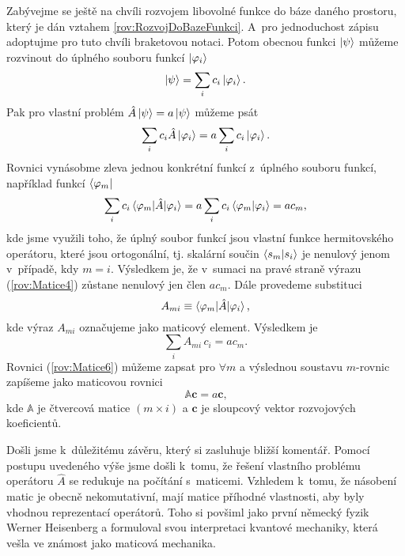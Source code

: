 Zabývejme se ještě na chvíli rozvojem libovolné funkce do báze daného prostoru, který je dán vztahem \eqref{rov:RozvojDoBazeFunkci}. A~pro jednoduchost zápisu adoptujme pro tuto chvíli braketovou notaci. Potom obecnou funkci $\ket{\psi}$ můžeme rozvinout do úplného souboru funkcí $\ket{\varphi_i}$
\begin{equation}
\ket{\psi} = \sum_i c_i \ket{\varphi_i} \mbox{.}
\nonumber
\end{equation}
Pak pro vlastní problém $\hat{A} \ket{\psi} = a \ket{\psi}$ můžeme psát
\begin{equation}
\sum_i c_i \hat{A} \ket{\varphi_i} = a \sum_i c_i \ket{\varphi_i} \mbox{.}
\nonumber
\end{equation}
Rovnici vynásobme zleva jednou konkrétní funkcí z~úplného souboru funkcí, například funkcí $\bra{\varphi_m}$
\begin{equation}
\sum_i c_i \braket{\varphi_m|\hat{A}|\varphi_i} = a \sum_i c_i \braket{\varphi_m|\varphi_i}= a c_m \mbox{,}
\label{rov:Matice4}
\end{equation}
kde jsme využili toho, že úplný soubor funkcí jsou vlastní funkce hermitovského operátoru, které jsou ortogonální, tj. skalární součin $\braket{s_m|s_i}$ je nenulový jenom v~případě, kdy $m=i$. Výsledkem je, že v~sumaci na pravé straně výrazu (\ref{rov:Matice4}) zůstane nenulový jen člen $a c_m$. Dále provedeme substituci
\begin{equation}
A_{mi} \equiv \braket{\varphi_m|\hat{A}|\varphi_i} \mbox{,}
\nonumber
\end{equation}
kde výraz $A_{mi}$ označujeme jako maticový element. Výsledkem je 
\begin{equation}
\sum_i A_{mi} \, c_i = a c_m \mbox{.}
\label{rov:Matice6}
\end{equation}
Rovnici (\ref{rov:Matice6}) můžeme zapsat pro $\forall m$ a výslednou soustavu $m$-rovnic zapíšeme jako maticovou rovnici
\begin{equation}
\boxed{\mathbb{A} \mathbf{c} = a \mathbf{c} \mbox{,}}
\label{rov:Matice7-vysledek}
\end{equation}
kde $\mathbb{A}$ je čtvercová matice $(m \times i)$ a $\mathbf{c}$ je sloupcový vektor rozvojových koeficientů.

Došli jsme k~důležitému závěru, který si zasluhuje bližší komentář. Pomocí postupu uvedeného výše jsme došli k~tomu, že řešení vlastního problému operátoru $\hat{A}$ se redukuje na počítání s~maticemi. Vzhledem k~tomu, že násobení matic je obecně nekomutativní, mají matice příhodné vlastnosti, aby byly vhodnou reprezentací operátorů. Toho si povšiml jako první německý fyzik Werner Heisenberg a formuloval svou interpretaci kvantové mechaniky, která vešla ve známost jako maticová mechanika.








